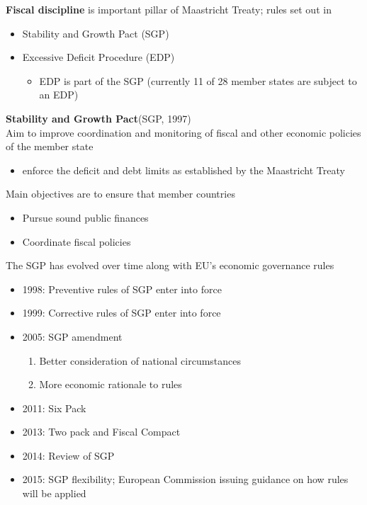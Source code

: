 \documentclass{beamer}
\begin{document}
\begin{frame}
  \textbf{Fiscal discipline} is important pillar of Maastricht Treaty; rules set out in 
\begin{itemize}
  \item Stability and Growth Pact (SGP)
  \item Excessive Deficit Procedure (EDP)
  \begin{itemize}
    \item EDP is part of the SGP (currently 11 of 28 member states are subject to an EDP)
  \end{itemize}  
\end{itemize}
\end{frame}

\begin{frame}
  \textbf{Stability and Growth Pact}(SGP, 1997)\\
  Aim to improve coordination and monitoring of fiscal and other economic policies of the member state
  \begin{itemize}
    \item enforce the deficit and debt limits as established by the Maastricht Treaty
  \end{itemize}
  \medskip
  Main objectives are to ensure that member countries
  \begin{itemize}
    \item Pursue sound public finances
    \item Coordinate fiscal policies
  \end{itemize}
\end{frame}

\begin{frame}
  The SGP has evolved over time along with EU's economic governance rules
\begin{itemize}
  \item 1998: Preventive rules of SGP enter into force
  \item 1999: Corrective rules of SGP enter into force
  \item 2005: SGP amendment
  \begin{enumerate}
    \item Better consideration of national circumstances
    \item More economic rationale to rules
  \end{enumerate}
  \medskip  
  \item 2011: Six Pack 
  \item 2013: Two pack and Fiscal Compact
  \item 2014: Review of SGP
  \item 2015: SGP flexibility; European Commission issuing guidance on how rules will be applied
\end{itemize}
\end{frame}
\end{document}
